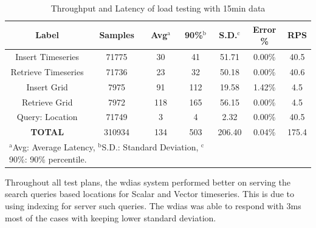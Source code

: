 \documentclass[conference]{IEEEtran}
\begin{document}
\begin{table}[htbp]
\caption{ Throughput and Latency of load testing with 15min data}
\begin{center}
\begin{adjustbox}{width=0.45\textwidth}
\footnotesize
\begin{tabular}{|c|c|c|c|c|c|c|}
\hline
\textbf{Label} & \textbf{Samples} & \textbf{Avg$^{\mathrm{a}}$} & \textbf{90\%$^{\mathrm{b}}$} & \textbf{S.D.$^{\mathrm{c}}$} & \textbf{Error \%} & \textbf{RPS} \\ \hline
Insert Timeseries & 71775 & 30 & 41 & 51.71 & 0.00\% & 40.5 \\ \hline
Retrieve Timeseries & 71736 & 23 & 32 & 50.18 & 0.00\% & 40.6 \\ \hline
Insert Grid & 7975 & 91 & 112 & 19.58 & 1.42\% & 4.5 \\ \hline
Retrieve Grid & 7972 & 118 & 165 & 56.15 & 0.00\% & 4.5 \\ \hline
Query: Location & 71749 & 3 & 4 & 2.32 & 0.00\% & 40.5 \\ \hline
\textbf{TOTAL} & 310934 & 134 & 503 & 206.40 & 0.04\% & 175.4 \\ \hline
\multicolumn{4}{l}{$^{\mathrm{a}}$Avg: Average Latency, $^{\mathrm{b}}$S.D.: Standard Deviation, $^{\mathrm{c}}$90\%: 90\% percentile.}
\end{tabular}
\end{adjustbox}
\label{ptab:obs_all_15_min_summary_throughput}
\end{center}
\end{table}

Throughout all test plans, the \acrshort{wdias} system performed better on serving the search queries based locations for Scalar and Vector timeseries. This is due to using indexing for server such queries. The \acrshort{wdias} was able to respond with 3ms most of the cases with keeping lower standard deviation.
\end{document}

